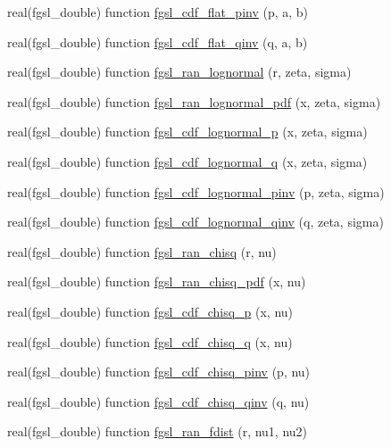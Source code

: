 \begin{DoxyCompactItemize}
\item 
real(fgsl\-\_\-double) function \hyperlink{rng_8finc_a42e0a48e22b8aa4b734ccf0f520d6431}{fgsl\-\_\-cdf\-\_\-flat\-\_\-pinv} (p, a, b)
\item 
real(fgsl\-\_\-double) function \hyperlink{rng_8finc_a42ecda3cd6d30fdcb53b3b04e421638d}{fgsl\-\_\-cdf\-\_\-flat\-\_\-qinv} (q, a, b)
\item 
real(fgsl\-\_\-double) function \hyperlink{rng_8finc_a595430ab8b59586c367cc046a9f5debf}{fgsl\-\_\-ran\-\_\-lognormal} (r, zeta, sigma)
\item 
real(fgsl\-\_\-double) function \hyperlink{rng_8finc_a202090301f103185a3f44733bb1bcbd5}{fgsl\-\_\-ran\-\_\-lognormal\-\_\-pdf} (x, zeta, sigma)
\item 
real(fgsl\-\_\-double) function \hyperlink{rng_8finc_a5316890ad8197da791afcc5910bb509a}{fgsl\-\_\-cdf\-\_\-lognormal\-\_\-p} (x, zeta, sigma)
\item 
real(fgsl\-\_\-double) function \hyperlink{rng_8finc_a1f399bfba773e619deb9db2831e1f219}{fgsl\-\_\-cdf\-\_\-lognormal\-\_\-q} (x, zeta, sigma)
\item 
real(fgsl\-\_\-double) function \hyperlink{rng_8finc_aa342d9e7c0eca77722ad14b0ccb3b7d8}{fgsl\-\_\-cdf\-\_\-lognormal\-\_\-pinv} (p, zeta, sigma)
\item 
real(fgsl\-\_\-double) function \hyperlink{rng_8finc_a5e05ee3c7093525db7b13b1dc7f21090}{fgsl\-\_\-cdf\-\_\-lognormal\-\_\-qinv} (q, zeta, sigma)
\item 
real(fgsl\-\_\-double) function \hyperlink{rng_8finc_aafcd4ad23110cdf85cc02b3c17864d57}{fgsl\-\_\-ran\-\_\-chisq} (r, nu)
\item 
real(fgsl\-\_\-double) function \hyperlink{rng_8finc_a01f35dd8aa35ff85f20a6d59868013c4}{fgsl\-\_\-ran\-\_\-chisq\-\_\-pdf} (x, nu)
\item 
real(fgsl\-\_\-double) function \hyperlink{rng_8finc_a4e32d508a8eac8c4edb7d00bcbcda230}{fgsl\-\_\-cdf\-\_\-chisq\-\_\-p} (x, nu)
\item 
real(fgsl\-\_\-double) function \hyperlink{rng_8finc_aa75769eb52c32b5d6c8e769fab0be280}{fgsl\-\_\-cdf\-\_\-chisq\-\_\-q} (x, nu)
\item 
real(fgsl\-\_\-double) function \hyperlink{rng_8finc_a397d079779dd1ce60251527321d48b62}{fgsl\-\_\-cdf\-\_\-chisq\-\_\-pinv} (p, nu)
\item 
real(fgsl\-\_\-double) function \hyperlink{rng_8finc_a4a8a7e2add3fdabcea95ab881048af06}{fgsl\-\_\-cdf\-\_\-chisq\-\_\-qinv} (q, nu)
\item 
real(fgsl\-\_\-double) function \hyperlink{rng_8finc_acd433cb70a78cc54e2c4d02e3a7f9291}{fgsl\-\_\-ran\-\_\-fdist} (r, nu1, nu2)

\end{DoxyCompactItemize}

